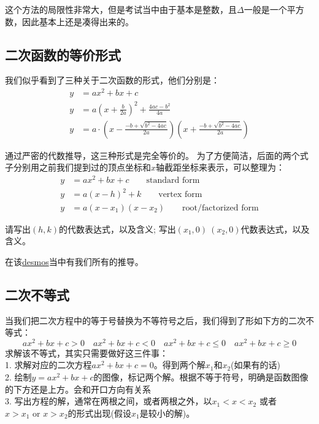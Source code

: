 这个方法的局限性非常大，但是考试当中由于基本是整数，且$\Delta$一般是一个平方数，因此基本上还是凑得出来的。

\subsection*{二次函数的等价形式}
\label{subsec:Multiple Equivalent Form of Quadratic Function}
我们似乎看到了三种关于二次函数的形式，他们分别是：
\begin{align*}
 y &= ax^2+bx+c\\
 y &= a\left(x+\frac{b}{2a}\right)^2+\frac{4ac-b^2}{4a}\\
 y &= a\cdot \left(x-\frac{-b+\sqrt{b^2-4ac}}{2a}\right)\left(x+\frac{-b+\sqrt{b^2-4ac}}{2a}\right)
\end{align*}

通过严密的代数推导，这三种形式是完全等价的。
为了方便简洁，后面的两个式子分别用之前我们提到过的顶点坐标和$x$轴截距坐标来表示，可以整理为：
\begin{align*}
 y &= ax^2+bx+c \qquad \text{standard form}\\
 y &= a(x-h)^2+k \qquad \text{vertex form}\\
 y &= a(x-x_1)(x-x_2)\qquad \text{root/factorized form}
\end{align*}

\begin{TaskBox}
请写出$(h,k)$的代数表达式，以及含义;
\tcblower
写出$(x_1,0) \ (x_2,0)$代数表达式，以及含义。
\end{TaskBox} 

在该\href{https://www.desmos.com/calculator/vzy4hytj5j}{desmos}当中有我们所有的推导。

\subsection*{二次不等式}
\label{subsec:Quadratic Inequality}
当我们把二次方程中的等于号替换为不等符号之后，我们得到了形如下方的二次不等式：
\[
	ax^2+bx+c>0 \quad ax^2+bx+c<0 \quad ax^2+bx+c\le 0 \quad ax^2+bx+c\ge0
\]
求解该不等式，其实只需要做好这三件事：\\
1. 求解对应的二次方程$ax^2+bx+c=0$。得到两个解$x_1$和$x_2$(如果有的话)\\
2. 绘制$y=ax^2+bx+c$的图像，标记两个解。根据不等于符号，明确是函数图像的下方还是上方。会和开口方向有关系\\
3. 写出方程的解，通常在两根之间，或者两根之外，以$x_1<x<x_2$ 或者 $x>x_1 \text{ or } x>x_2$的形式出现(假设$x_1$是较小的解)。

